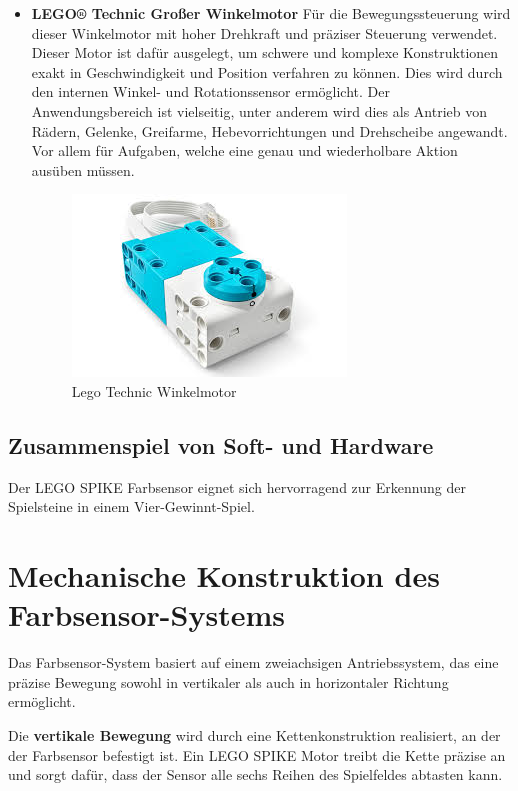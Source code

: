 \begin{itemize}
\item \textbf{LEGO® Technic Großer Winkelmotor}
Für die Bewegungssteuerung wird dieser Winkelmotor mit hoher Drehkraft und präziser Steuerung verwendet. Dieser Motor ist dafür ausgelegt, um schwere und komplexe Konstruktionen exakt in Geschwindigkeit und Position verfahren zu können. Dies wird durch den internen Winkel- und Rotationssensor ermöglicht. Der Anwendungsbereich ist vielseitig, unter anderem wird dies als Antrieb von Rädern, Gelenke, Greifarme, Hebevorrichtungen und Drehscheibe angewandt. Vor allem für Aufgaben, welche eine genau und wiederholbare Aktion ausüben müssen.

\begin{figure}[H]
	\centering
	\includegraphics[width=0.5\linewidth]{images/Motor}
	\caption{Lego Technic Winkelmotor}
	\label{fig:motor}
\end{figure}

\end{itemize}

\subsection{Zusammenspiel von Soft- und Hardware}

Der LEGO SPIKE Farbsensor eignet sich hervorragend zur Erkennung der Spielsteine in einem Vier-Gewinnt-Spiel. 

\section{Mechanische Konstruktion des Farbsensor-Systems}

Das Farbsensor-System basiert auf einem zweiachsigen Antriebssystem, das eine präzise Bewegung sowohl in vertikaler als auch in horizontaler Richtung ermöglicht. 

Die \textbf{vertikale Bewegung} wird durch eine Kettenkonstruktion realisiert, an der der Farbsensor befestigt ist. Ein LEGO SPIKE Motor treibt die Kette präzise an und sorgt dafür, dass der Sensor alle sechs Reihen des Spielfeldes abtasten kann. 


